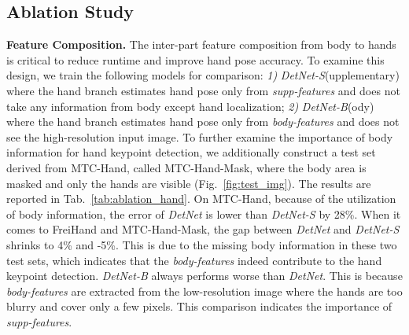 \documentclass[final]{cvpr}
\begin{document}
 \subsection{Ablation Study}
\label{sec:ablation}
\noindent \textbf{Feature Composition.}
The inter-part feature composition from body to hands is critical to reduce runtime and improve hand pose accuracy.
To examine this design, we train the following models for comparison:
\textit{1)} \textit{DetNet-S}(upplementary) where the hand branch estimates hand pose only from \textit{supp-features}  and does not take any information from body except hand localization;
\textit{2)} \textit{DetNet-B}(ody) where the hand branch estimates hand pose only from \textit{body-features}  and does not see the high-resolution input image.
To further examine the importance of body information for hand keypoint detection, we additionally construct a test set derived from MTC-Hand, called MTC-Hand-Mask, where the body area is masked and only the hands are visible (Fig.~\ref{fig:test_img}).
The results are reported in Tab.~\ref{tab:ablation_hand}.
On MTC-Hand, because of the utilization of body information, the error of \textit{DetNet} is lower than \textit{DetNet-S} by 28\%.
When it comes to FreiHand and MTC-Hand-Mask, the gap between \textit{DetNet} and \textit{DetNet-S} shrinks to 4\% and \mbox{-5\%}.
This is due to the missing body information in these two test sets, which indicates that the \textit{body-features} indeed contribute to the hand keypoint detection.
\textit{DetNet-B} always performs worse than \textit{DetNet}.
This is because \textit{body-features} are extracted from the low-resolution image where the hands are too blurry and cover only a few pixels.
This comparison indicates the importance of \textit{supp-features}.
\begin{table}[t]
  \centering
  \caption{
Ablation study on \textit{body-features} and \textit{supp-features}.
The comparison between the three versions demonstrates the help of  and  in the hand pose estimation task.
}
	\label{tab:ablation_hand}
\end{table}
\end{document}
